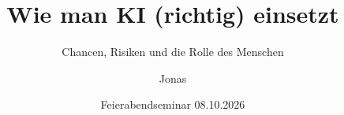 \title[Umgang mit KI]{Wie man KI (richtig) einsetzt}
\subtitle{Chancen, Risiken und die Rolle des Menschen}
\author{Jonas}
\institute{}
\date{Feierabendseminar 08.10.2026}
\titlegraphic{}
